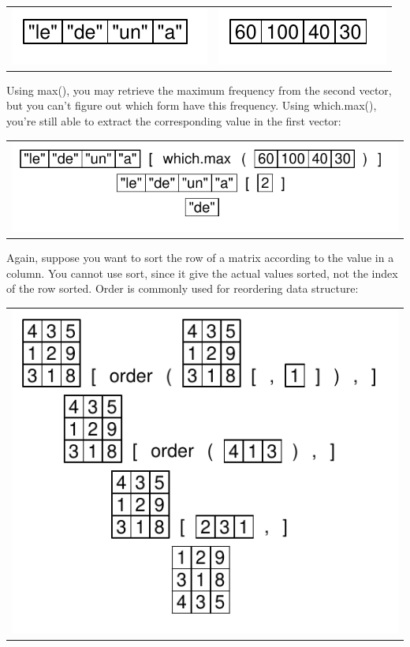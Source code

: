 \documentclass[pdflatex]{article}
\begin{document}
\begin{tabular}{cc}
\includegraphics{v_forms} & \includegraphics{v_frequencies}\\
\end{tabular}

Using max(), you may retrieve the maximum frequency from the second vector, but
you can't figure out which form have this frequency. Using which.max(), you're
still able to extract the corresponding value in the first vector:

\begin{tabular}{c}
\includegraphics{which_max_2}
\end{tabular}

Again, suppose you want to sort the row of a matrix according to the value in a
column. You cannot use sort, since it give the actual values sorted, not the
index of the row sorted. Order is commonly used for reordering data structure:

\begin{tabular}{c}
\includegraphics{matrix_order}
\end{tabular}
\end{document}
